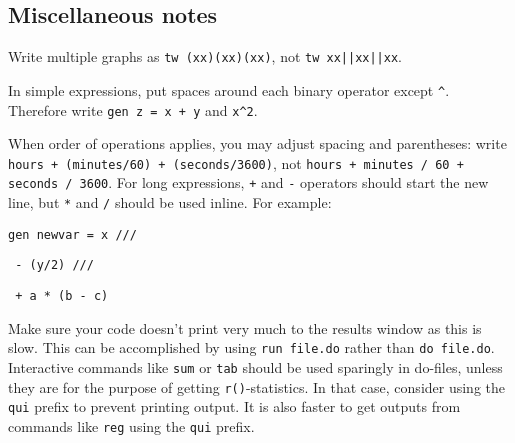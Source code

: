 
\subsection{Miscellaneous notes}

Write multiple graphs as \texttt{tw (xx)(xx)(xx)}, not \texttt{tw xx||xx||xx}.

\bigskip\noindent In simple expressions, put spaces around each binary operator except \texttt{\^}.
Therefore write \texttt{gen z = x + y} and \texttt{x\^}\texttt{2}.

\bigskip\noindent When order of operations applies, you may adjust spacing and parentheses: write
\texttt{hours + (minutes/60) + (seconds/3600)}, not \texttt{hours + minutes / 60 + seconds / 3600}.
For long expressions, \texttt{+} and \texttt{-} operators should start the new line,
but \texttt{*} and \texttt{/} should be used inline. For example:

\texttt{gen newvar =   x ///}

\texttt{             - (y/2) ///}

\texttt{             + a * (b - c)}

\bigskip\noindent  Make sure your code doesn't print very much to the results window as this is slow.
This can be accomplished by using \texttt{run file.do} rather than \texttt{do file.do}.
Interactive commands like \texttt{sum} or \texttt{tab} should be used sparingly in do-files,
unless they are for the purpose of getting \texttt{r()}-statistics.
In that case, consider using the \texttt{qui} prefix to prevent printing output.
It is also faster to get outputs from commands like \texttt{reg} using the \texttt{qui} prefix.

\mainmatter
